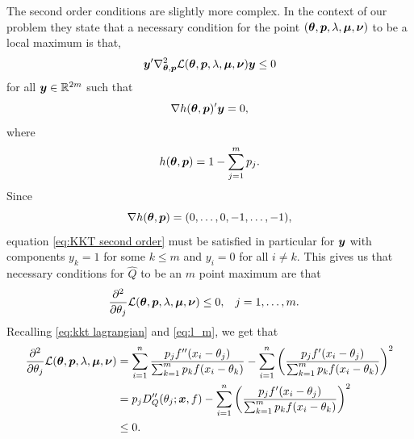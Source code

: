 	The second order conditions are slightly more complex. In the context of our problem they state \cite[Proposition 3.3.1]{Bertsekas1995-mh} that a necessary condition for the point $({\bm{{\theta}}}, {\bm{{p}}}, \lambda, {\bm{{\mu}}}, {\bm{{\nu}}})$ to be a local maximum is that,
	\begin{equation}
		{\bm{{y}}}' \nabla^2_{{\bm{{\theta}}}, {\bm{{p}}}} \mathcal{L}({\bm{{\theta}}}, {\bm{{p}}}, \lambda, {\bm{{\mu}}}, {\bm{{\nu}}}) {\bm{{y}}} \leq 0
		\label{eq:KKT second order}
	\end{equation}
	for all ${\bm{{y}}} \in \mathbb{R}^{2m}$ such that
	\begin{equation}
		\nabla h({\bm{{\theta}}}, {\bm{{p}}})' {\bm{{y}}} = 0,
	\end{equation}
	where
	\begin{equation}
		h({\bm{{\theta}}}, {\bm{{p}}}) = 1 - \sum_{j = 1}^m p_j.
	\end{equation}
	Since 
	\begin{equation}
		\nabla h({\bm{{\theta}}}, {\bm{{p}}}) = (0, \dots, 0, -1, \dots, -1),
	\end{equation}
	equation \eqref{eq:KKT second order} must be satisfied in particular for ${\bm{{y}}}$ with components $y_k = 1$ for some $k \leq m$ and $y_i  = 0$ for all $i \neq k$. This gives us that necessary conditions for $\hat{Q}$ to be an $m$ point maximum are that
	\begin{align}
		\frac{\partial^2}{\partial \theta_j} \mathcal{L}({\bm{{\theta}}}, {\bm{{p}}}, \lambda, {\bm{{\mu}}}, {\bm{{\nu}}}) &\leq 0, && j = 1, \dots, m.
	\end{align}
	Recalling \eqref{eq:kkt lagrangian} and \eqref{eq:l_m}, we get that
	\begin{align}
		\frac{\partial^2}{\partial \theta_j} \mathcal{L}({\bm{{\theta}}}, {\bm{{p}}}, \lambda, {\bm{{\mu}}}, {\bm{{\nu}}}) &= \sum_{i = 1}^n \frac{p_j f''(x_i - \theta_j)}{\sum_{k = 1}^m p_k f(x_i - \theta_k)} - \sum_{i = 1}^n \left(\frac{p_j f'(x_i - \theta_j)}{\sum_{k = 1}^m p_k f(x_i - \theta_k)}\right)^2 \\
		&= p_j D_Q''(\theta_j;{\bm{{x}}}, f) - \sum_{i = 1}^n \left(\frac{p_j f'(x_i - \theta_j)}{\sum_{k = 1}^m p_k f(x_i - \theta_k)}\right)^2 \\
		&\leq 0.
	\end{align}
